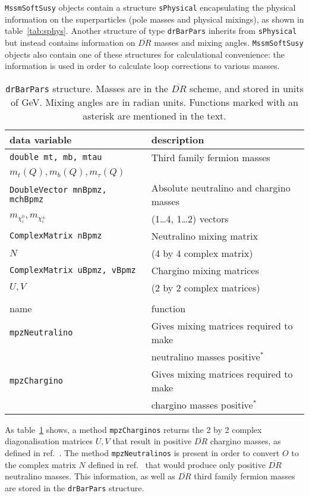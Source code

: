 \documentclass[]{article}
\def\code#1{\small{\tt #1}\normalsize}
\begin{document}
\code{MssmSoftSusy} objects contain a structure \code{sPhysical} encapsulating
the physical information on the superparticles (pole masses and physical
mixings), as shown in table~\ref{tab:sphys}.  
Another structure of type \code{drBarPars} inherits from \code{sPhysical} but
instead contains information on $\overline{DR}$ masses and mixing angles. 
\code{MssmSoftSusy} objects
also contain one of these structures for calculational convenience:
the information is used in order
to calculate loop corrections to various masses.
\begin{table}\begin{center}\begin{tabular}{ll} 
data variable & description \\ \hline
\code{double mt, mb, mtau} & Third family fermion masses \\
$m_t(Q), m_b(Q), m_\tau(Q)$ &                     \\ \hline
\code{DoubleVector mnBpmz, mchBpmz} & Absolute neutralino and chargino masses\\
$m_{\chi_i^0}, m_{\chi^\pm_i}$ & (1\ldots4, 1\ldots2) vectors \\ \hline
\code{ComplexMatrix nBpmz} & Neutralino mixing matrix \\
$N$          & (4 by 4 complex matrix) \\ \hline
\code{ComplexMatrix uBpmz, vBpmz} & Chargino mixing matrices \\
$U, V$       & (2 by 2 complex matrices) \\ \hline
 & \\
name         & function \\ \hline
\code{mpzNeutralino} & Gives mixing matrices required to make \\ & neutralino
masses positive$^*$\\ 
\code{mpzChargino} & Gives mixing matrices required to make \\ & chargino
masses positive$^*$\\ 
\end{tabular}
\caption{\label{tab:drbarpars}\code{drBarPars} structure. Masses are in the $\overline{DR}$ scheme, and
  stored in units of GeV. Mixing angles are in radian units. Functions marked
  with an asterisk are mentioned in the text.}\end{center}\end{table}
As table~\ref{tab:drbarpars} shows, a
method \code{mpzCharginos} returns the 2 by 2 complex diagonalisation
matrices $U,V$ that result in positive $\overline{DR}$ chargino masses, as
defined in ref.~\cite{Pierce:1997zz}. 
The method
\code{mpzNeutralinos} is present in order to convert $O$ to the complex matrix
$N$ defined in ref.~\cite{Pierce:1997zz} that would produce only positive
$\overline{DR}$ neutralino masses. This information, as well as
$\overline{DR}$ third family
fermion masses are stored in the \code{drBarPars} structure.
\end{document}
